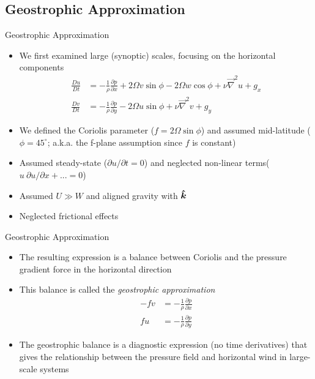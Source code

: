 \subsection{Geostrophic Approximation}
\begin{frame}{Geostrophic Approximation}

\begin{itemize}
	\item We first examined large (synoptic) scales, focusing on the horizontal components
	\begin{align*}
	\frac{Du}{Dt} &= -\frac{1}{\rho}	\frac{\partial p}{\partial x} + 2\Omega v \sin \phi - 2\Omega w \cos \phi + \nu \vec \nabla^2 u + g_x\\
	\frac{Dv}{Dt} &= -\frac{1}{\rho}	\frac{\partial p}{\partial y} - 2 \Omega u \sin \phi + \nu \vec \nabla^2 v + g_y
	\end{align*}
	\item We defined the Coriolis parameter ($f=2\Omega \sin \phi$) and assumed mid-latitude ($\phi = 45^\circ$; a.k.a. the f-plane assumption since $f$ is constant)
	\item Assumed steady-state ($\partial u/\partial t=0$) and neglected non-linear terms($u\ \partial u/\partial x + ... = 0$)
	\item Assumed $U\gg W$ and aligned gravity with $\boldsymbol{\hat{k}}$
	\item Neglected frictional effects
\end{itemize}
\end{frame}
\begin{frame}{Geostrophic Approximation}

\begin{itemize}
	\item The resulting expression is a balance between Coriolis and the pressure gradient force in the horizontal direction
	\item This balance is called the \textit{geostrophic approximation}
	\begin{align*}
	-f v &= -\frac{1}{\rho}\frac{\partial p}{\partial x}\\
	f u &= -\frac{1}{\rho}\frac{\partial p}{\partial y}
	\end{align*}
	\item The geostrophic balance is a diagnostic expression (no time derivatives) that gives the relationship between the pressure field and horizontal wind in large-scale systems
\end{itemize}
\end{frame}


